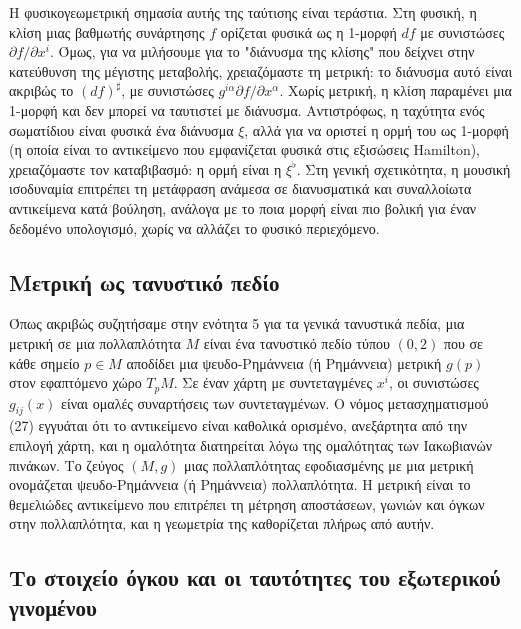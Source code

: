 \documentclass[12pt]{article}
\begin{document}
Η φυσικογεωμετρική σημασία αυτής της ταύτισης είναι τεράστια. Στη φυσική, η κλίση μιας βαθμωτής συνάρτησης \( f \) ορίζεται φυσικά ως η 1-μορφή \( df \) με συνιστώσες \( \partial f / \partial x^i \). Όμως, για να μιλήσουμε για το "διάνυσμα της κλίσης" που δείχνει στην κατεύθυνση της μέγιστης μεταβολής, χρειαζόμαστε τη μετρική: το διάνυσμα αυτό είναι ακριβώς το \( (df)^\sharp \), με συνιστώσες \( g^{i\alpha} \partial f / \partial x^\alpha \). Χωρίς μετρική, η κλίση παραμένει μια 1-μορφή και δεν μπορεί να ταυτιστεί με διάνυσμα. Αντιστρόφως, η ταχύτητα ενός σωματίδιου είναι φυσικά ένα διάνυσμα \( \xi \), αλλά για να οριστεί η ορμή του ως 1-μορφή (η οποία είναι το αντικείμενο που εμφανίζεται φυσικά στις εξισώσεις Hamilton), χρειαζόμαστε τον καταβιβασμό: η ορμή είναι η \( \xi^\flat \). Στη γενική σχετικότητα, η μουσική ισοδυναμία επιτρέπει τη μετάφραση ανάμεσα σε διανυσματικά και συναλλοίωτα αντικείμενα κατά βούληση, ανάλογα με το ποια μορφή είναι πιο βολική για έναν δεδομένο υπολογισμό, χωρίς να αλλάζει το φυσικό περιεχόμενο.

\subsection{Μετρική ως τανυστικό πεδίο}

Όπως ακριβώς συζητήσαμε στην ενότητα 5 για τα γενικά τανυστικά πεδία, μια μετρική σε μια πολλαπλότητα \( M \) είναι ένα τανυστικό πεδίο τύπου \( (0,2) \) που σε κάθε σημείο \( p \in M \) αποδίδει μια ψευδο-Ρημάννεια (ή Ρημάννεια) μετρική \( g(p) \) στον εφαπτόμενο χώρο \( T_pM \). Σε έναν χάρτη με συντεταγμένες \( x^i \), οι συνιστώσες \( g_{ij}(x) \) είναι ομαλές συναρτήσεις των συντεταγμένων. Ο νόμος μετασχηματισμού (27) εγγυάται ότι το αντικείμενο είναι καθολικά ορισμένο, ανεξάρτητα από την επιλογή χάρτη, και η ομαλότητα διατηρείται λόγω της ομαλότητας των Ιακωβιανών πινάκων. Το ζεύγος \( (M, g) \) μιας πολλαπλότητας εφοδιασμένης με μια μετρική ονομάζεται ψευδο-Ρημάννεια (ή Ρημάννεια) πολλαπλότητα. Η μετρική είναι το θεμελιώδες αντικείμενο που επιτρέπει τη μέτρηση αποστάσεων, γωνιών και όγκων στην πολλαπλότητα, και η γεωμετρία της καθορίζεται πλήρως από αυτήν.

\subsection{Το στοιχείο όγκου και οι ταυτότητες του εξωτερικού γινομένου}
\end{document}
